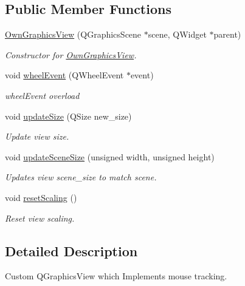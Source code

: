 \subsection*{Public Member Functions}
\begin{DoxyCompactItemize}
\item 
\mbox{\hyperlink{classOwnGraphicsView_a57f2f9617077ce2a1d30ec3f6c7144db}{Own\+Graphics\+View}} (Q\+Graphics\+Scene $\ast$scene, Q\+Widget $\ast$parent)
\begin{DoxyCompactList}\small\item\em Constructor for \mbox{\hyperlink{classOwnGraphicsView}{Own\+Graphics\+View}}. \end{DoxyCompactList}\item 
void \mbox{\hyperlink{classOwnGraphicsView_aa1fcab658f07793e921b8b79815d4430}{wheel\+Event}} (Q\+Wheel\+Event $\ast$event)
\begin{DoxyCompactList}\small\item\em wheel\+Event overload \end{DoxyCompactList}\item 
void \mbox{\hyperlink{classOwnGraphicsView_ac44fdf0870779587fcaf8855f905cdf3}{update\+Size}} (Q\+Size new\+\_\+size)
\begin{DoxyCompactList}\small\item\em Update view size. \end{DoxyCompactList}\item 
void \mbox{\hyperlink{classOwnGraphicsView_aed25dd7c6e958838fcfa7709363ffc9c}{update\+Scene\+Size}} (unsigned width, unsigned height)
\begin{DoxyCompactList}\small\item\em Updates view scene\+\_\+size to match scene. \end{DoxyCompactList}\item 
void \mbox{\hyperlink{classOwnGraphicsView_a4aff62ba2da3d0e4a671ec0a8042e242}{reset\+Scaling}} ()
\begin{DoxyCompactList}\small\item\em Reset view scaling. \end{DoxyCompactList}\end{DoxyCompactItemize}


\subsection{Detailed Description}
Custom Q\+Graphics\+View which Implements mouse tracking. 


